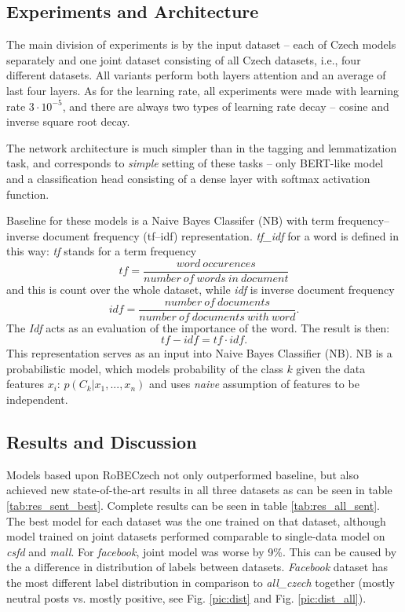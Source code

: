 \subsection{Experiments and Architecture}
The main division of experiments is by the input dataset -- each of Czech models separately and one joint dataset consisting of all Czech datasets, i.e., four different datasets. All variants perform both layers attention and an average of last four layers. As for the learning rate, all experiments were made with learning rate $3 \cdot 10^{-5}$, and there are always two types of learning rate decay -- cosine and inverse square root decay. 
\par
The network architecture is much simpler than in the tagging and lemmatization task, and corresponds to \textit{simple} setting of these tasks -- only BERT-like model and a classification head consisting of a dense layer with softmax activation function. 
\par 
Baseline for these models is a Naive Bayes Classifer (NB) with term frequency--inverse document frequency (tf--idf) representation. \textit{tf\_idf} for a word is defined in this way: \textit{tf} stands for a term frequency
\[ \mathit{tf} = \frac{word\ occurences}{number\ of\ words\ in\ document} \]
and this is count over the whole dataset, while \textit{idf} is inverse document frequency
\[\mathit{idf} = \frac{number\ of\ documents}{number\ of\ documents\ with\ word}.\] The \textit{Idf} acts as an evaluation of the importance of the word. The result is then: \[\mathit{tf-idf} = tf \cdot idf .\] 
This representation serves as an input into Naive Bayes Classifier (NB). NB \citep{duda1973pattern} is a probabilistic model, which models probability of the class $k$ given the data features $x_i$: $p(C_k|x_1,...,x_n)$ and uses \textit{naive} assumption of features to be independent. 

\subsection{Results and Discussion}
Models based upon RoBECzech not only outperformed baseline, but also achieved new state-of-the-art results in all three datasets as can be seen in table \ref{tab:res_sent_best}. Complete results can be seen in table \ref{tab:res_all_sent}. The best model for each dataset was the one trained on that dataset, although model trained on joint datasets performed comparable to single-data model on \textit{csfd} and \textit{mall}. For \textit{facebook}, joint model was worse by 9\%. This can be caused by the a difference in distribution of labels between datasets. \textit{Facebook} dataset has the most different label distribution in comparison to \textit{all\_czech} together (mostly neutral posts vs. mostly positive, see Fig. \ref{pic:dist} and Fig. \ref{pic:dist_all}). 

